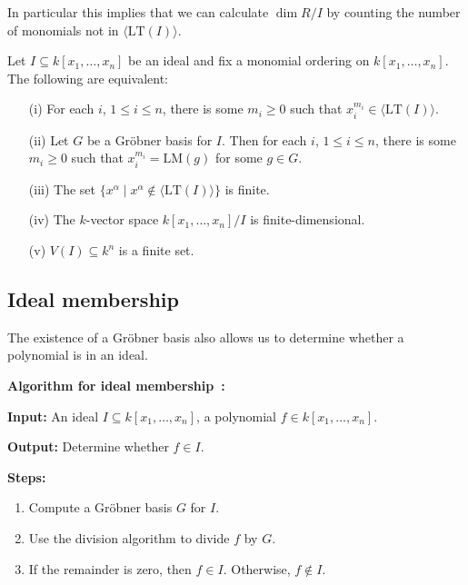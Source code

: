 \documentclass[12pt]{article}
\newcounter{algorithm}
\newenvironment{algorithm}[1][Algorithm]{%
    \refstepcounter{algorithm}%
    \noindent\textbf{\color{orange}#1~\thealgorithm:}%
}{}
\begin{document}
In particular this implies that we can calculate $\dim R/I$ by counting the number of monomials not in $\langle \mathrm{LT}(I) \rangle$.
\begin{theorem}
	Let \( I \subseteq k[x_1, \dots, x_n] \) be an ideal and fix a monomial ordering on \( k[x_1, \dots, x_n] \). The following are equivalent:
	\begin{enumerate}
		\item[(i)] For each \( i \), \( 1 \leq i \leq n \), there is some \( m_i \geq 0 \) such that \( x_i^{m_i} \in \langle \mathrm{LT}(I) \rangle \).
		\item[(ii)] Let \( G \) be a Gr\"obner basis for \( I \). Then for each \( i \), \( 1 \leq i \leq n \), there is some \( m_i \geq 0 \) such that \( x_i^{m_i} = \mathrm{LM}(g) \) for some \( g \in G \).
		\item[(iii)] The set \( \{x^\alpha \mid x^\alpha \notin \langle \mathrm{LT}(I) \rangle \} \) is finite.
		\item[(iv)] The \( k \)-vector space \( k[x_1, \dots, x_n]/I \) is finite-dimensional.
		\item[(v)] \( V(I) \subseteq k^n \) is a finite set.
	\end{enumerate}

\end{theorem}
\subsection{Ideal membership}
The existence of a Gr\"obner basis also allows us to determine whether a polynomial is in an ideal.

\begin{algorithm}[Algorithm for ideal membership]

	\textbf{Input:} An ideal \( I \subseteq k[x_1, \ldots, x_n] \), a polynomial \( f \in k[x_1, \ldots, x_n] \).

	\textbf{Output:} Determine whether \( f \in I \).

	\textbf{Steps:}
	\begin{enumerate}
		\item Compute a Gr\"obner basis \( G \) for \( I \).
		\item Use the division algorithm to divide \( f \) by \( G \).
		\item If the remainder is zero, then \( f \in I \). Otherwise, \( f \notin I \).
	\end{enumerate}
\end{algorithm}
\end{document}
